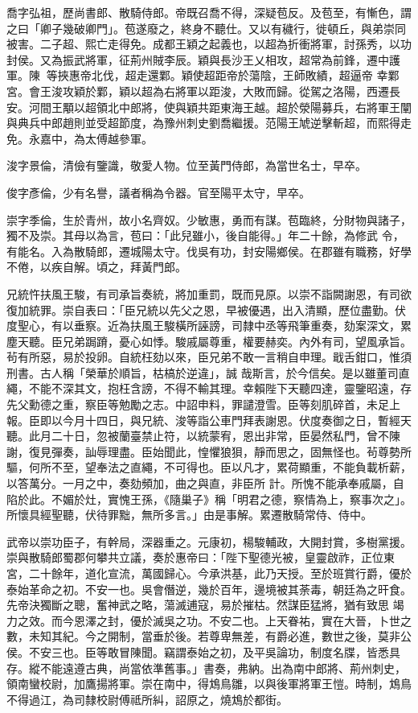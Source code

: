 \begin{pinyinscope}
 喬字弘祖，歷尚書郎、散騎侍郎。帝既召喬不得，深疑苞反。及苞至，有慚色，謂之曰「卿子幾破卿門」。苞遂廢之，終身不聽仕。又以有穢行，徙頓丘，與弟崇同被害。二子超、熙亡走得免。成都王穎之起義也，以超為折衝將軍，討孫秀，以功封侯。又為振武將軍，征荊州賊李辰。穎與長沙王乂相攻，超常為前鋒，遷中護軍。陳等挾惠帝北伐，超走還鄴。穎使超距帝於蕩陰，王師敗績，超逼帝
 幸鄴宮。會王浚攻穎於鄴，穎以超為右將軍以距浚，大敗而歸。從駕之洛陽，西遷長安。河間王顒以超領北中郎將，使與穎共距東海王越。超於滎陽募兵，右將軍王闡與典兵中郎趙則並受超節度，為豫州刺史劉喬繼援。范陽王虓逆擊斬超，而熙得走免。永嘉中，為太傅越參軍。



 浚字景倫，清儉有鑒識，敬愛人物。位至黃門侍郎，為當世名士，早卒。



 俊字彥倫，少有名譽，議者稱為令器。官至陽平太守，早卒。



 崇字季倫，生於青州，故小名齊奴。少敏惠，勇而有謀。苞臨終，分財物與諸子，獨不及崇。其母以為言，苞曰：「此兒雖小，後自能得。」年二十餘，為修武
 令，有能名。入為散騎郎，遷城陽太守。伐吳有功，封安陽鄉侯。在郡雖有職務，好學不倦，以疾自解。頃之，拜黃門郎。



 兄統忤扶風王駿，有司承旨奏統，將加重罰，既而見原。以崇不詣闕謝恩，有司欲復加統罪。崇自表曰：「臣兄統以先父之恩，早被優遇，出入清顯，歷位盡勤。伏度聖心，有以垂察。近為扶風王駿橫所誣謗，司隸中丞等飛筆重奏，劾案深文，累塵天聽。臣兄弟跼蹐，憂心如悸。駿戚屬尊重，權要赫奕。內外有司，望風承旨。茍有所惡，易於投卵。自統枉劾以來，臣兄弟不敢一言稍自申理。戢舌鉗口，惟須刑書。古人稱「榮華於順旨，枯槁於逆違」，誠
 哉斯言，於今信矣。是以雖董司直繩，不能不深其文，抱枉含謗，不得不輸其理。幸賴陛下天聽四達，靈鑒昭遠，存先父勳德之重，察臣等勉勵之志。中詔申料，罪譴澄雪。臣等刻肌碎首，未足上報。臣即以今月十四日，與兄統、浚等詣公車門拜表謝恩。伏度奏御之日，暫經天聽。此月二十日，忽被蘭臺禁止符，以統蒙宥，恩出非常，臣晏然私門，曾不陳謝，復見彈奏，訕辱理盡。臣始聞此，惶懼狼狽，靜而思之，固無怪也。茍尊勢所驅，何所不至，望奉法之直繩，不可得也。臣以凡才，累荷顯重，不能負載析薪，以答萬分。一月之中，奏劾頻加，曲之與直，非臣所
 計。所愧不能承奉戚屬，自陷於此。不媚於灶，實愧王孫，《隨巢子》稱「明君之德，察情為上，察事次之」。所懷具經聖聽，伏待罪黜，無所多言。」由是事解。累遷散騎常侍、侍中。



 武帝以崇功臣子，有幹局，深器重之。元康初，楊駿輔政，大開封賞，多樹黨援。崇與散騎郎蜀郡何攀共立議，奏於惠帝曰：「陛下聖德光被，皇靈啟祚，正位東宮，二十餘年，道化宣流，萬國歸心。今承洪基，此乃天授。至於班賞行爵，優於泰始革命之初。不安一也。吳會僭逆，幾於百年，邊境被其荼毒，朝廷為之旰食。先帝決獨斷之聰，奮神武之略，蕩滅逋寇，易於摧枯。然謀臣猛將，猶有致思
 竭力之效。而今恩澤之封，優於滅吳之功。不安二也。上天眷祐，實在大晉，卜世之數，未知其紀。今之開制，當垂於後。若尊卑無差，有爵必進，數世之後，莫非公侯。不安三也。臣等敢冒陳聞。竊謂泰始之初，及平吳論功，制度名牒，皆悉具存。縱不能遠遵古典，尚當依準舊事。」書奏，弗納。出為南中郎將、荊州刺史，領南蠻校尉，加鷹揚將軍。崇在南中，得鴆鳥雛，以與後軍將軍王愷。時制，鴆鳥不得過江，為司隸校尉傅祗所糾，詔原之，燒鴆於都街。




\end{pinyinscope}
